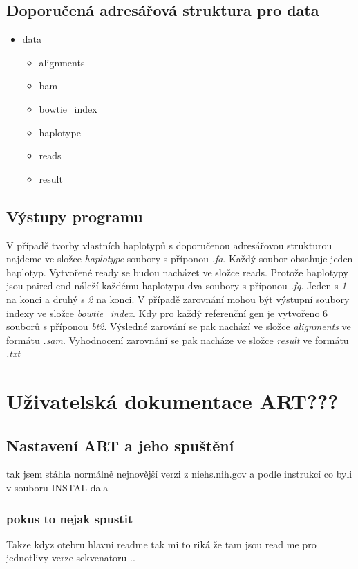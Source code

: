 \documentclass[czech,DP]{thesiskiv}
\numberwithin{equation}{section}
\begin{document}
\section{Doporučená adresářová struktura pro data}
\begin{itemize}
	\item data
		\begin{itemize}
			\item alignments
			\item bam
			\item bowtie\_index
			\item haplotype
			\item reads
			\item result
		\end{itemize}
\end{itemize}

\section{Výstupy programu}
V případě tvorby vlastních haplotypů s doporučenou adresářovou strukturou najdeme ve složce \textit{haplotype} soubory s příponou \textit{.fa}. Každý soubor obsahuje jeden haplotyp.
Vytvořené ready se budou nacházet ve složce reads. Protože haplotypy jsou paired-end náleží každému haplotypu dva soubory s příponou \textit{.fq}. Jeden s \textit{1} na konci a druhý s \textit{2} na konci. 
V případě zarovnání mohou být výstupní soubory indexy ve složce \textit{bowtie\_index}. Kdy pro každý referenční gen je vytvořeno 6 souborů s příponou \textit{bt2}. Výsledné zarování se pak nachází ve složce \textit{alignments} ve formátu \textit{.sam}. Vyhodnocení zarovnání se pak nacháze ve složce \textit{result} ve formátu \textit{.txt}

\chapter{Uživatelská dokumentace ART???}
\section{Nastavení ART a jeho spuštění}
tak jsem stáhla normálně nejnovější verzi z niehs.nih.gov a podle instrukcí co byli v souboru INSTAL dala %

\subsection{pokus to nejak spustit}
Takze kdyz otebru hlavni readme tak mi to riká že tam jsou read me pro jednotlivy verze sekvenatoru ..
\end{document}
